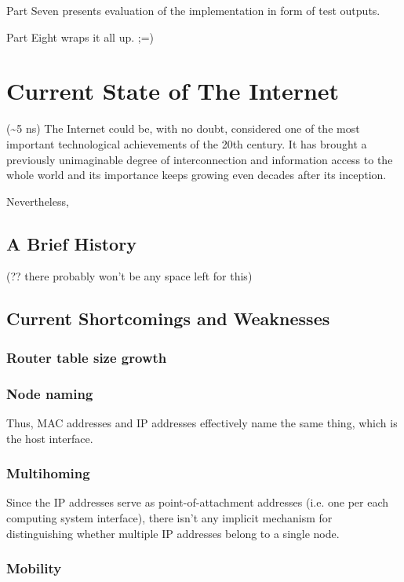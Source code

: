         Part Seven presents evaluation of the implementation in form of test outputs.

        Part Eight wraps it all up. ;=)

\chapter{Current State of The Internet}
    (\textasciitilde5 ns)
    The Internet could be, with no doubt, considered one of the most important technological achievements of the 20th century. It has brought a previously unimaginable degree of interconnection and information access to the whole world and its importance keeps growing even decades after its inception.

    Nevertheless,

    \section{A Brief History}
        (?? there probably won't be any space left for this)

    \section{Current Shortcomings and Weaknesses}

        \subsection{Router table size growth}

        \subsection{Node naming}

            Thus, MAC addresses and IP addresses effectively name the same thing, which is the host interface.

        \subsection{Multihoming}

            Since the IP addresses serve as point-of-attachment addresses (i.e. one per each computing system interface), there isn't any implicit mechanism for distinguishing whether multiple IP addresses belong to a single node.

        \subsection{Mobility}

